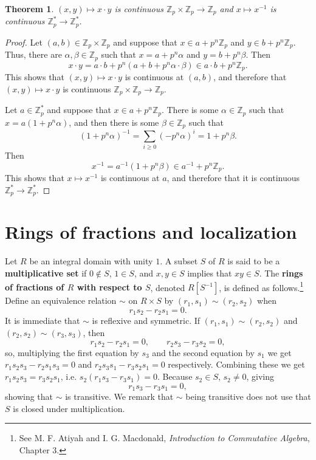 \documentclass{article}
\newtheorem{theorem}{Theorem}
\theoremstyle{definition}
\begin{document}
\begin{theorem}
$(x,y) \mapsto x\cdot y$ is continuous $\mathbb{Z}_p \times \mathbb{Z}_p \to \mathbb{Z}_p$ and
$x \mapsto x^{-1}$ is continuous $\mathbb{Z}_p^* \to \mathbb{Z}_p^*$. 
\end{theorem}
\begin{proof}
Let $(a,b) \in \mathbb{Z}_p \times \mathbb{Z}_p$ and suppose that $x \in a+p^n \mathbb{Z}_p$ and $y \in b +p^n \mathbb{Z}_p$. 
Thus, there are $\alpha,\beta \in \mathbb{Z}_p$ such that $x=a+p^n\alpha$ and $y=b+p^n\beta$. Then
\[
x\cdot y = a\cdot b+p^n(a+b+p^n\alpha\cdot \beta) \in a\cdot b +p^n \mathbb{Z}_p.
\]
This shows that $(x,y) \mapsto x\cdot y$ is continuous at $(a,b)$, and therefore that $(x,y) \mapsto x\cdot y$ is continuous
$\mathbb{Z}_p \times \mathbb{Z}_p \to \mathbb{Z}_p$.

Let $a \in \mathbb{Z}_p^*$ and suppose that $x \in a+p^n \mathbb{Z}_p$. There is some $\alpha \in \mathbb{Z}_p$ such that
$x=a(1+p^n \alpha)$, and then there is some $\beta \in \mathbb{Z}_p$ such that
\[
(1+p^n \alpha)^{-1} = \sum_{i \geq 0} (-p^n \alpha)^i = 1+p^n \beta.
\]
Then
\[
x^{-1}=a^{-1}(1+p^n\beta) \in a^{-1} + p^n \mathbb{Z}_p.
\]
This shows that $x \mapsto x^{-1}$ is continuous at $a$, and therefore that it is continuous $\mathbb{Z}_p^* \to
\mathbb{Z}_p^*$.
\end{proof}


\section{Rings of fractions and localization}
Let $R$ be an integral domain with unity $1$. A subset $S$ of $R$ is said to be a 
\textbf{multiplicative set} if $0 \not \in S$, 
$1 \in S$, and 
$x,y \in S$ implies that $xy \in S$. The \textbf{rings of fractions of $R$ with respect to  $S$}, denoted $R[S^{-1}]$, is defined as follows.\footnote{See
M. F. Atiyah and I. G. Macdonald, {\em Introduction to Commutative Algebra}, Chapter 3.}
Define an equivalence relation $\sim$ on $R \times S$ by
$(r_1,s_1) \sim (r_2,s_2)$ when 
\[
r_1s_2-r_2 s_1=0.
\]
It is immediate that $\sim$ is reflexive and symmetric.
If $(r_1,s_1) \sim (r_2,s_2)$ and $(r_2,s_2) \sim (r_3,s_3)$, then
\[
r_1s_2-r_2 s_1=0, \qquad r_2s_3-r_3 s_2=0,
\]
so, multiplying the first equation by $s_3$ and the second equation by $s_1$ we get
$r_1s_2s_3-r_2s_1s_3 = 0$ and $r_2s_3s_1-r_3s_2s_1=0$ respectively. Combining these we get 
$r_1s_2s_3=r_3s_2s_1$, i.e. $s_2(r_1s_3-r_3s_1)=0$. Because $s_2 \in S$, $s_2 \neq 0$, giving 
\[
r_1s_3-r_3s_1=0,
\]
showing that $\sim$ is transitive. We remark that $\sim$ being transitive does not use that $S$ is closed under multiplication.
\end{document}
